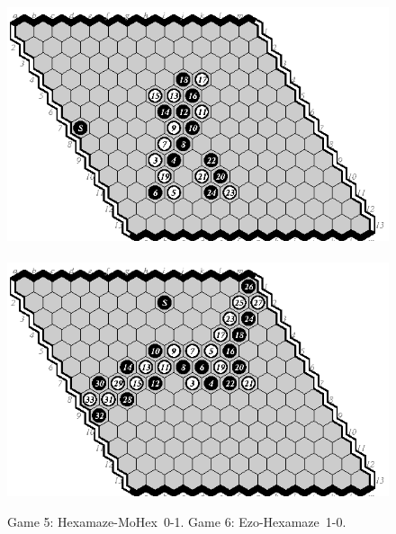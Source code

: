 \documentclass{icga}
\def\Eo{\mbox{\sc Ezo}}
\def\Hz{\mbox{\sc Hexamaze}}
\def\Mx{\mbox{\sc MoHex}}
\begin{document}
\begin{figure}[hbp]
\includegraphics[scale=1.2]{games/pix/13-05-hm-0-1.eps}\hspace*{-1cm}\
\includegraphics[scale=1.2]{games/pix/13-06-eh-1-0.eps}
\caption{Game 5: \Hz-\Mx\ 0-1. Game 6: \Eo-\Hz\ 1-0.}
\end{figure}
\end{document}
